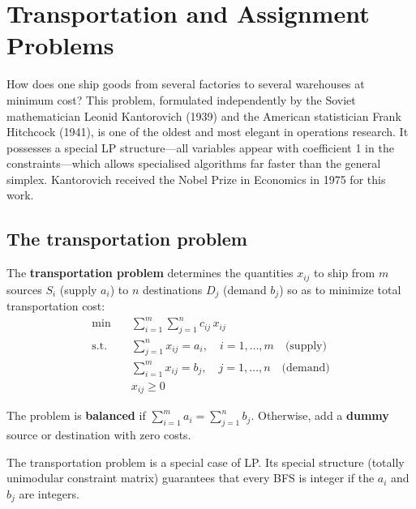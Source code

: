 \chapter{Transportation and Assignment Problems}
\label{ch:transportation}

How does one ship goods from several factories to several warehouses at minimum cost? This problem, formulated independently by the Soviet mathematician Leonid Kantorovich (1939) and the American statistician Frank Hitchcock (1941), is one of the oldest and most elegant in operations research. It possesses a special LP structure---all variables appear with coefficient 1 in the constraints---which allows specialised algorithms far faster than the general simplex. Kantorovich received the Nobel Prize in Economics in 1975 for this work.

\section{The transportation problem}

\begin{definition}
The \textbf{transportation problem} determines the quantities $x_{ij}$ to
ship from $m$ sources $S_i$ (supply $a_i$) to $n$ destinations $D_j$
(demand $b_j$) so as to minimize total transportation cost:
\[
\begin{aligned}
  \min \quad & \sum_{i=1}^{m}\sum_{j=1}^{n} c_{ij}\, x_{ij} \\
  \text{s.t.} \quad
    & \sum_{j=1}^{n} x_{ij} = a_i, \quad i = 1, \ldots, m
      \quad \text{(supply)} \\
    & \sum_{i=1}^{m} x_{ij} = b_j, \quad j = 1, \ldots, n
      \quad \text{(demand)} \\
    & x_{ij} \ge 0
\end{aligned}
\]
\end{definition}

\begin{definition}
The problem is \textbf{balanced} if $\sum_{i=1}^m a_i = \sum_{j=1}^n b_j$.
Otherwise, add a \textbf{dummy} source or destination with zero costs.
\end{definition}

\begin{remark}
The transportation problem is a special case of LP.  Its special structure
(totally unimodular constraint matrix) guarantees that every BFS is integer
if the $a_i$ and $b_j$ are integers.
\end{remark}

